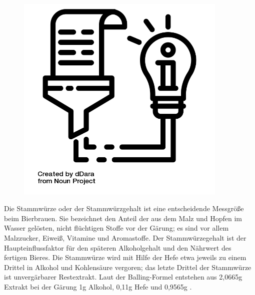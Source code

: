 \documentclass{scrartcl}  %
\begin{document}
\vspace{0.3cm}
			\begin{tcolorbox}[enhanced,
				colback=white,
				colframe=darkgray,
				fonttitle=\sffamily\bfseries\large, 
				title=Die Stammwürze,  %
				attach boxed title to top left={xshift=3.2mm,yshift=-0.50mm},
				boxed title style={skin=enhancedfirst jigsaw,size=small,arc=1mm,bottom=-1mm,colframe=darkgray,height=0.75cm},
				colbacktitle=darkgray,
				drop lifted shadow]
				\begin{figure}  
					\centering
					\vspace{-14pt}  %
					\includegraphics[width=0.9\textwidth]{symbols/symbol_tex_content}
				\end{figure}
				
				Die Stammwürze oder der Stammwürzgehalt ist eine entscheidende Messgröße beim Bierbrauen. Sie bezeichnet den Anteil der aus dem Malz und Hopfen im Wasser gelösten, nicht flüchtigen Stoffe vor der Gärung; es sind vor allem Malzzucker, Eiweiß, Vitamine und Aromastoffe. \newline
				Der Stammwürzegehalt ist der Haupteinflussfaktor für den späteren Alkoholgehalt und den Nährwert des fertigen Bieres. Die Stammwürze wird mit Hilfe der Hefe etwa jeweils zu einem Drittel in Alkohol und Kohlensäure vergoren; das letzte Drittel der Stammwürze ist unvergärbarer Restextrakt. \newline 
				Laut der Balling-Formel entstehen aus 2,0665g Extrakt bei der Gärung 1g Alkohol, 0,11g Hefe und 0,9565g .				
			\end{tcolorbox}
\end{document}
